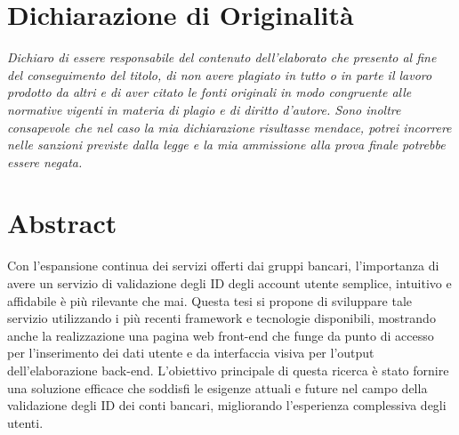 \chapter*{Dichiarazione di Originalità}
\vspace{75pt}
{\large
\textit{Dichiaro di essere responsabile del contenuto dell’elaborato che presento al fine del conseguimento del titolo, di non avere plagiato in tutto o in parte il lavoro prodotto da altri e di aver citato le fonti originali in modo congruente alle normative vigenti in materia di plagio e di diritto d’autore. Sono inoltre consapevole che nel caso la mia dichiarazione risultasse mendace, potrei incorrere nelle sanzioni previste dalla legge e la mia ammissione alla prova finale potrebbe essere negata.}
}

\newpage
\chapter*{Abstract}
\vspace{75pt}
{\large
Con l'espansione continua dei servizi offerti dai gruppi bancari, l'importanza di avere un servizio di validazione degli ID degli account utente semplice, intuitivo e affidabile è più rilevante che mai. Questa tesi si propone di sviluppare tale servizio utilizzando i più recenti framework e tecnologie disponibili, mostrando anche la realizzazione una pagina web front-end che funge da punto di accesso per l'inserimento dei dati utente e da interfaccia visiva per l'output dell’elaborazione back-end. L'obiettivo principale di questa ricerca è stato fornire una soluzione efficace che soddisfi le esigenze attuali e future nel campo della validazione degli ID dei conti bancari, migliorando l'esperienza complessiva degli utenti.
}